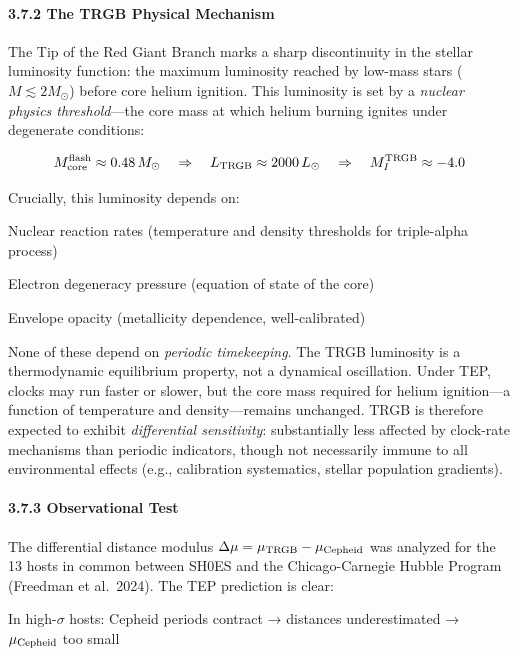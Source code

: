 \documentclass[
]{article}
\begin{document}
\paragraph{3.7.2 The TRGB Physical
Mechanism}\label{the-trgb-physical-mechanism}

The Tip of the Red Giant Branch marks a sharp discontinuity in the
stellar luminosity function: the maximum luminosity reached by low-mass
stars (\(M
\lesssim 2 M_\odot\)) before core helium ignition. This luminosity is
set by a \emph{nuclear physics threshold}---the core mass at which
helium burning ignites under degenerate conditions:

\begin{equation}
M_{\rm core}^{\rm flash} \approx 0.48 \, M_\odot \quad \Rightarrow \quad L_{\rm TRGB} \approx 2000 \, L_\odot \quad \Rightarrow \quad M_I^{\rm TRGB} \approx -4.0
\end{equation}

Crucially, this luminosity depends on:

Nuclear reaction rates (temperature and density thresholds for
triple-alpha process)

Electron degeneracy pressure (equation of state of the core)

Envelope opacity (metallicity dependence, well-calibrated)

None of these depend on \emph{periodic timekeeping}. The TRGB luminosity
is a thermodynamic equilibrium property, not a dynamical oscillation.
Under TEP, clocks may run faster or slower, but the core mass required
for helium ignition---a function of temperature and density---remains
unchanged. TRGB is therefore expected to exhibit \emph{differential
sensitivity}: substantially less affected by clock-rate mechanisms than
periodic indicators, though not necessarily immune to all environmental
effects (e.g., calibration systematics, stellar population gradients).

\paragraph{3.7.3 Observational Test}\label{observational-test}

The differential distance modulus
\(\Delta\mu = \mu_{\rm TRGB} - \mu_{\rm
Cepheid}\) was analyzed for the 13 hosts in common between SH0ES and the
Chicago-Carnegie Hubble Program (Freedman et al.~2024). The TEP
prediction is clear:

In high-\(\sigma\) hosts: Cepheid periods contract → distances
underestimated → \(\mu_{\rm Cepheid}\) too small
\end{document}
